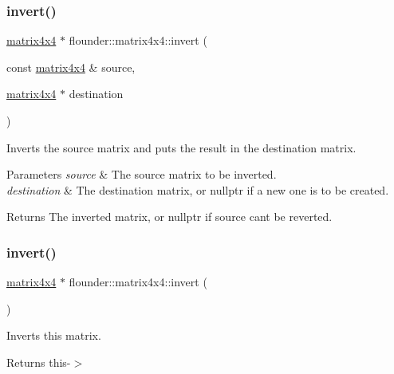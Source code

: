 \subsubsection{\texorpdfstring{invert()}{invert()}\hspace{0.1cm}{\footnotesize\ttfamily [1/2]}}
{\footnotesize\ttfamily \hyperlink{classflounder_1_1matrix4x4}{matrix4x4} $\ast$ flounder\+::matrix4x4\+::invert (\begin{DoxyParamCaption}\item[{const \hyperlink{classflounder_1_1matrix4x4}{matrix4x4} \&}]{source,  }\item[{\hyperlink{classflounder_1_1matrix4x4}{matrix4x4} $\ast$}]{destination }\end{DoxyParamCaption})\hspace{0.3cm}{\ttfamily [static]}}



Inverts the source matrix and puts the result in the destination matrix. 


\begin{DoxyParams}{Parameters}
{\em source} & The source matrix to be inverted. \\
\hline
{\em destination} & The destination matrix, or nullptr if a new one is to be created. \\
\hline
\end{DoxyParams}
\begin{DoxyReturn}{Returns}
The inverted matrix, or nullptr if source can\textquotesingle{}t be reverted. 
\end{DoxyReturn}
\mbox{\label{classflounder_1_1matrix4x4_ad8959f0c459bb67eb884806f7303c468}} 
\subsubsection{\texorpdfstring{invert()}{invert()}\hspace{0.1cm}{\footnotesize\ttfamily [2/2]}}
{\footnotesize\ttfamily \hyperlink{classflounder_1_1matrix4x4}{matrix4x4} $\ast$ flounder\+::matrix4x4\+::invert (\begin{DoxyParamCaption}{ }\end{DoxyParamCaption})}



Inverts this matrix. 

\begin{DoxyReturn}{Returns}
this-\/$>$ 
\end{DoxyReturn}
\mbox{\label{classflounder_1_1matrix4x4_a971e94747366db81af609bb97da9b2ed}} 
